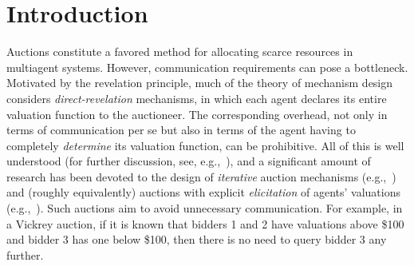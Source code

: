 \documentclass{aamas2013}
\begin{document}

\section{Introduction}

Auctions constitute a favored method for allocating scarce resources in
multiagent systems.  However, communication requirements can pose a
bottleneck.  Motivated by the revelation principle, much of the theory of
mechanism design considers {\em direct-revelation} mechanisms, in which
each agent declares its entire valuation function to the auctioneer.  The
corresponding overhead, not only in terms of communication per se but also
in terms of the agent having to completely {\em determine} its valuation
function, can be prohibitive.  All of this is well understood (for further
discussion, see, e.g.,~\cite{Conitzer04:Computational}), and a significant amount of research has been
devoted to the design of {\em iterative} auction mechanisms (e.g.,~\cite{Parkes06:Iterative}) and (roughly
equivalently) auctions with explicit {\em elicitation} of agents'
valuations (e.g.,~\cite{Sandholm06:Preference}).  Such auctions aim to avoid
unnecessary communication.  For example, in a Vickrey auction, if it is known
that bidders 1 and 2 have valuations above \$100 and bidder 3 has one below
\$100, then there is no need to query bidder 3 any further.
\end{document}
